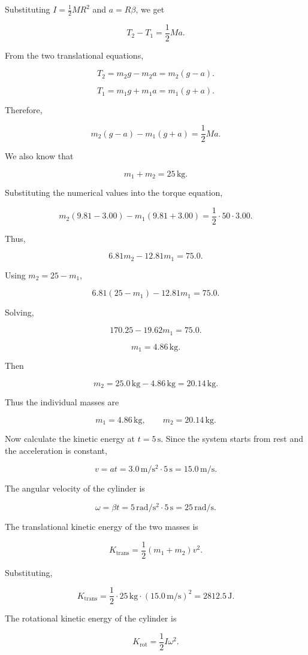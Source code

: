 \documentclass[letterpaper,12pt]{letter}
\begin{document}
\begin{enumerate}[label=\Roman*.]
\begin{enumerate}[label=\arabic*.]
Substituting $I=\frac{1}{2}MR^2$ and $a=R\beta$, we get

$$T_2-T_1=\frac{1}{2}Ma.$$

From the two translational equations,

$$T_2=m_2g-m_2a=m_2(g-a).$$

$$T_1=m_1g+m_1a=m_1(g+a).$$

Therefore,

$$m_2(g-a)-m_1(g+a)=\frac{1}{2}Ma.$$

We also know that

$$m_1+m_2=25\,\mathrm{kg}.$$

Substituting the numerical values into the torque equation,

$$m_2(9.81-3.00)-m_1(9.81+3.00)=\frac{1}{2}\cdot50\cdot3.00.$$

Thus,

$$6.81m_2-12.81m_1=75.0.$$

Using $m_2=25-m_1$,

$$6.81(25-m_1)-12.81m_1=75.0.$$

Solving,

$$170.25-19.62m_1=75.0.$$

$$m_1=4.86\,\mathrm{kg}.$$

Then

$$m_2=25.0\,\mathrm{kg}-4.86\,\mathrm{kg}=20.14\,\mathrm{kg}.$$

Thus the individual masses are

$$\boxed{m_1=4.86\,\mathrm{kg}},\qquad\boxed{m_2=20.14\,\mathrm{kg}}.$$

Now calculate the kinetic energy at $t=5\,\mathrm{s}$. Since the system starts from rest and the acceleration is constant,

$$v=at=3.0\,\mathrm{m/s^2}\cdot5\,\mathrm{s}=15.0\,\mathrm{m/s}.$$

The angular velocity of the cylinder is

$$\omega=\beta t=5\,\mathrm{rad/s^2}\cdot5\,\mathrm{s}=25\,\mathrm{rad/s}.$$

The translational kinetic energy of the two masses is

$$K_{\mathrm{trans}}=\frac{1}{2}(m_1+m_2)v^2.$$

Substituting,

$$K_{\mathrm{trans}}=\frac{1}{2}\cdot25\,\mathrm{kg}\cdot(15.0\,\mathrm{m/s})^2=2812.5\,\mathrm{J}.$$

The rotational kinetic energy of the cylinder is

$$K_{\mathrm{rot}}=\frac{1}{2}I\omega^2.$$


\end{enumerate}
\end{enumerate}
\end{document}
